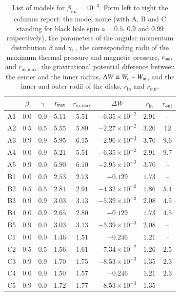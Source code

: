 \documentclass{aa}
\begin{document}
\begin{table}
\caption{List of models for $\beta_{\mathrm{m}_{\mathrm{c}}} = 10^{-3}
$. Form left to right the columns report: the model name (with A, B and C standing for black hole spin $a = 0.5$, $0.9$ and $0.99$ respectively), the parameters of the angular momentum distribution $\beta$ and $\gamma$, , the corresponding radii of the maximum thermal pressure and magnetic pressure, $r_{{\rm{max}}}$ and $r_{{\mathrm{m, max}}}$, the gravitational potential diference between the center and the inner radius, $\Delta W\equiv W_{\rm c}-W_{\rm in}$, and the inner and outer radii of the disks, $r_{\mathrm{in}}$ and $r_{\mathrm{out}}$.}             
\label{table:3}      
\centering          
\begin{tabular}{c c c c  c c c c}
\hline\hline       
 & $\beta$ & $\gamma$ & $r_{\rm{max}}$ &  $r_{\mathrm{m, max}}$ & $\Delta W$ & $r_{\mathrm{in}}$ & $r_{\mathrm{out}}$ \\ 
\hline           
A1 & $0.0$ & $0.0$ &  $5.11$  & $5.51$ & $-6.35 \times 10^{-2}$ & $2.91$ & -- \\ 
A2 & $0.5$ & $0.5$ & $5.55$ &  $5.80$  & $-2.27 \times 10^{-2}$ & $3.20$ & $12$\\ 
A3 & $0.9$ & $0.9$ & $5.95$ &  $6.15$  & $-2.96 \times 10^{-3}$ & $3.70$ &  $9.6$\\ 
A4 & $0.0$ & $0.9$ & $5.21$ &  $5.51$  & $-6.35 \times 10^{-2}$ & $2.91$ & $9.7$\\ 
A5 & $0.9$ & $0.0$ & $5.90$ &  $6.10$  & $-2.95 \times 10^{-3}$ & $3.70$ & --\\ 
 \hline 
B1 & $0.0$ & $0.0$ & $2.53$ &  $2.73$  & $-0.129$ & $1.73$ & -- \\ 
B2 & $0.5$ & $0.5$ & $2.81$ &  $2.91$  & $-4.32 \times 10^{-2}$ & $1.86$ & $5.4$\\ 
B3 & $0.9$ & $0.9$ & $3.03$ &  $3.13$  & $-5.39 \times 10^{-3}$ & $2.08$ & $4.5$\\ 
B4 & $0.0$ & $0.9$ & $2.65$ &  $2.80$  & $-0.129$ & $1.73$ & $4.5$\\ 
B5 & $0.9$ & $0.0$ & $3.03$ &  $3.13$  & $-5.39 \times 10^{-3}$ & $2.08$ & -- \\  
 \hline 
C1 & $0.0$ & $0.0$ & $1.46$ & $1.51$ & $-0.246$ & $1.21$ & -- \\ 
C2 & $0.5$ & $0.5$ & $1.56$ &  $1.61$  & $-7.34 \times 10^{-2}$ & $1.26$ & $2.5$\\ 
C3 & $0.9$ & $0.9$ & $1.70$ &  $1.75$  & $-8.53 \times 10^{-3}$ & $1.35$ & $2.3$\\ 
C4 & $0.0$ & $0.9$ & $1.50$ &  $1.57$  & $-0.246$ & $1.21$ & $2.3$\\ 
C5 & $0.9$ & $0.0$ & $1.72$ &  $1.77$  & $-8.53 \times 10^{-3}$ & $1.35$ & --\\ 
\hline      
\end{tabular}
\end{table}
\end{document}
